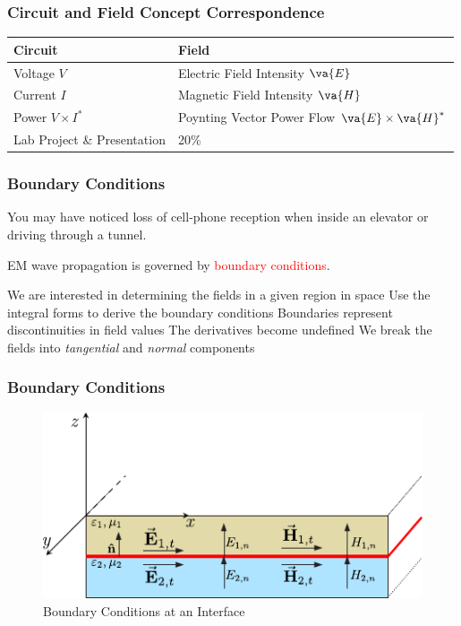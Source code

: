 \documentclass[10pt, compress]{beamer}
\begin{document}
\begin{frame}
  \frametitle{Circuit and Field Concept Correspondence}
\begin{table}
      \begin{tabular}{ll}
      \toprule
      Circuit & Field\\
      \midrule
      Voltage $V$ & Electric Field Intensity $\va{E}$ \\
      Current $I$ & Magnetic Field Intensity $\va{H}$  \\
      Power $V \times I^{*}$ & Poynting Vector Power Flow $\va{E} \times \va{H}^*$ \\
      Lab Project \& Presentation & 20\% \\
      \bottomrule
    \end{tabular}
  \end{table}
\end{frame}
\begin{frame}
  \frametitle{Boundary Conditions}
  You may have noticed loss of cell-phone reception when inside an elevator or driving through a tunnel.

  EM wave propagation is governed by \textcolor{red}{boundary conditions}.
  \begin{outline}
    \1 We are interested in determining the fields in a given region in space
    \2 Use the integral forms to derive the boundary conditions
    \1 Boundaries represent discontinuities in field values
    \2 The derivatives become undefined
    \1 We break the fields into \textit{tangential} and \textit{normal} components
  \end{outline}
\end{frame}
\begin{frame}
  \frametitle{Boundary Conditions}
  \begin{figure}
    \centering
          \includegraphics[width=.9\textwidth]{BC.pdf}
      \caption{Boundary Conditions at an Interface}
  \end{figure}
\end{frame}
\end{document}

